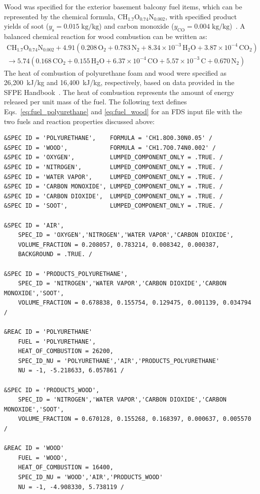\documentclass[12pt,oneside]{book}
\renewcommand{\C}{\mbox{C}}
\renewcommand{\H}{\mbox{H}}
\renewcommand{\O}{\mbox{O}}
\newcommand{\N}{\mbox{N}}
\begin{document}
\clearpage


Wood was specified for the exterior basement balcony fuel items, which can be represented by the chemical formula, $\C\H_{1.7}\O_{0.74}\N_{0.002}$, with specified product yields of soot ($y_{\mathrm{s}}=0.015 \; \mathrm{kg}/\mathrm{kg}$) and carbon monoxide ($y_{\mathrm{CO}}=0.004 \; \mathrm{kg}/\mathrm{kg}$)~\cite{SFPE:Tewarson}. A balanced chemical reaction for wood combustion can be written as:
\begin{multline}
\C\H_{1.7}\O_{0.74}\N_{0.002} + 4.91(0.208\,\O_{2} + 0.783\,\N_{2} + 8.34 \times 10^{-3}\,\H_{2}\O + 3.87 \times 10^{-4}\,\C\O_{2}) \\
\rightarrow 5.74(0.168\,\C\O_{2} + 0.155\,\H_{2}\O + 6.37 \times 10^{-4}\,\C\O + 5.57 \times 10^{-3}\,\C + 0.670\,\N_{2})
\label{eq:fuel_wood}
\end{multline}
The heat of combustion of polyurethane foam and wood were specified as 26,200~kJ/kg and 16,400~kJ/kg, respectively, based on data provided in the SFPE Handbook~\cite{SFPE:Tewarson}. The heat of combustion represents the amount of energy released per unit mass of the fuel. The following text defines Eqs.~\ref{eq:fuel_polyurethane} and \ref{eq:fuel_wood} for an FDS input file with the two fuels and reaction properties discussed above:

\begin{lstlisting}[basicstyle=\ttfamily\scriptsize]
&SPEC ID = 'POLYURETHANE',    FORMULA = 'CH1.8O0.30N0.05' /
&SPEC ID = 'WOOD',            FORMULA = 'CH1.7O0.74N0.002' /
&SPEC ID = 'OXYGEN',          LUMPED_COMPONENT_ONLY = .TRUE. /
&SPEC ID = 'NITROGEN',        LUMPED_COMPONENT_ONLY = .TRUE. /
&SPEC ID = 'WATER VAPOR',     LUMPED_COMPONENT_ONLY = .TRUE. /
&SPEC ID = 'CARBON MONOXIDE', LUMPED_COMPONENT_ONLY = .TRUE. /
&SPEC ID = 'CARBON DIOXIDE',  LUMPED_COMPONENT_ONLY = .TRUE. /
&SPEC ID = 'SOOT',            LUMPED_COMPONENT_ONLY = .TRUE. /

&SPEC ID = 'AIR',
    SPEC_ID = 'OXYGEN','NITROGEN','WATER VAPOR','CARBON DIOXIDE',
    VOLUME_FRACTION = 0.208057, 0.783214, 0.008342, 0.000387,
    BACKGROUND = .TRUE. /

&SPEC ID = 'PRODUCTS_POLYURETHANE',
    SPEC_ID = 'NITROGEN','WATER VAPOR','CARBON DIOXIDE','CARBON MONOXIDE','SOOT',
    VOLUME_FRACTION = 0.678838, 0.155754, 0.129475, 0.001139, 0.034794 /

&REAC ID = 'POLYURETHANE'
    FUEL = 'POLYURETHANE',
    HEAT_OF_COMBUSTION = 26200,
    SPEC_ID_NU = 'POLYURETHANE','AIR','PRODUCTS_POLYURETHANE'
    NU = -1, -5.218633, 6.057861 /

&SPEC ID = 'PRODUCTS_WOOD',
    SPEC_ID = 'NITROGEN','WATER VAPOR','CARBON DIOXIDE','CARBON MONOXIDE','SOOT',
    VOLUME_FRACTION = 0.670128, 0.155268, 0.168397, 0.000637, 0.005570 /

&REAC ID = 'WOOD'
    FUEL = 'WOOD',
    HEAT_OF_COMBUSTION = 16400,
    SPEC_ID_NU = 'WOOD','AIR','PRODUCTS_WOOD'
    NU = -1, -4.908330, 5.738119 /
\end{lstlisting}
\end{document}
